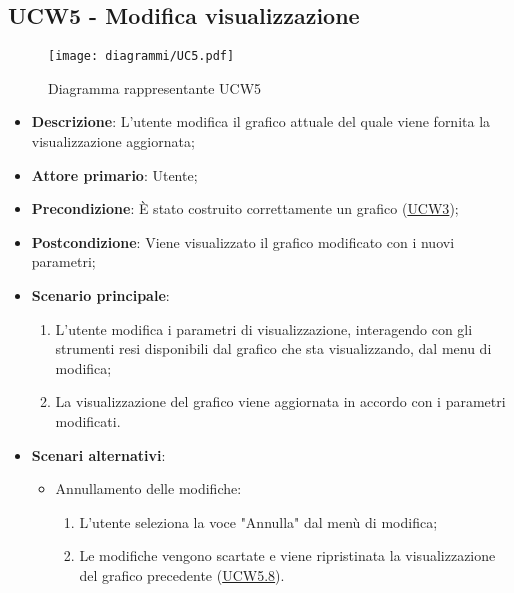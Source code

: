 \subsection{UCW5 - Modifica visualizzazione}
\label{sub:ucw5}

\begin{figure}[h]
    \centering
    \texttt{[image: diagrammi/UC5.pdf]}
    \caption{Diagramma rappresentante UCW5}
    \label{fig:UCW5}
\end{figure}


\begin{itemize}
    \item \textbf{Descrizione}: L’utente modifica il grafico attuale del quale viene fornita la visualizzazione 
    aggiornata;

    \item \textbf{Attore primario}: Utente;

    \item \textbf{Precondizione}:   È stato costruito correttamente un grafico (\hyperref[sub:ucw3]{UCW3});

    \item \textbf{Postcondizione}:  Viene visualizzato il grafico modificato con i nuovi parametri;

	\item \textbf{Scenario principale}:
		\begin{enumerate}
            \item L'utente modifica i parametri di visualizzazione, interagendo con gli strumenti resi disponibili dal 
            grafico che sta visualizzando, dal menu di modifica;
            \item La visualizzazione del grafico viene aggiornata in accordo con i parametri modificati.
        \end{enumerate}

    \item \textbf{Scenari alternativi}:
    \begin{itemize}
        \item Annullamento delle modifiche:
        \begin{enumerate}
            \item L'utente seleziona la voce "Annulla" dal menù di modifica;
            \item Le modifiche vengono scartate e viene ripristinata la visualizzazione del grafico precedente 
            (\hyperref[ssub:ucw5.8]{UCW5.8}).
        \end{enumerate}
    \end{itemize}

\end{itemize}

